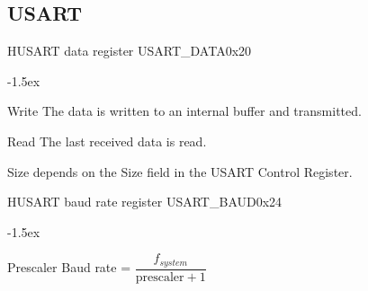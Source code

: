 \documentclass[12pt]{article}
\begin{document}
\subsection{USART}

\begin{register}{H}{USART data register USART\_DATA}{0x20}
\label{usartdata}
%
%
\regnewline%
\end{register}
\begin{regdesc}[0.6\textwidth]\begin{reglist}[000000000]
\itemsep-1.5ex
\item[Write] The data is written to an internal buffer and transmitted.
\item[Read] The last received data is read.
\end{reglist}\end{regdesc}
\hspace*{2cm}Size depends on the Size field in the USART Control Register.

\begin{register}{H}{USART baud rate register USART\_BAUD}{0x24}
\label{usartbaud}
%
%
\regnewline%
\end{register}
\begin{regdesc}[0.6\textwidth]\begin{reglist}[000000000]
\itemsep-1.5ex
\item[Prescaler] Baud rate = $\dfrac{f_{system}}{\textrm{prescaler}+1}$
\end{reglist}\end{regdesc}
\end{document}

